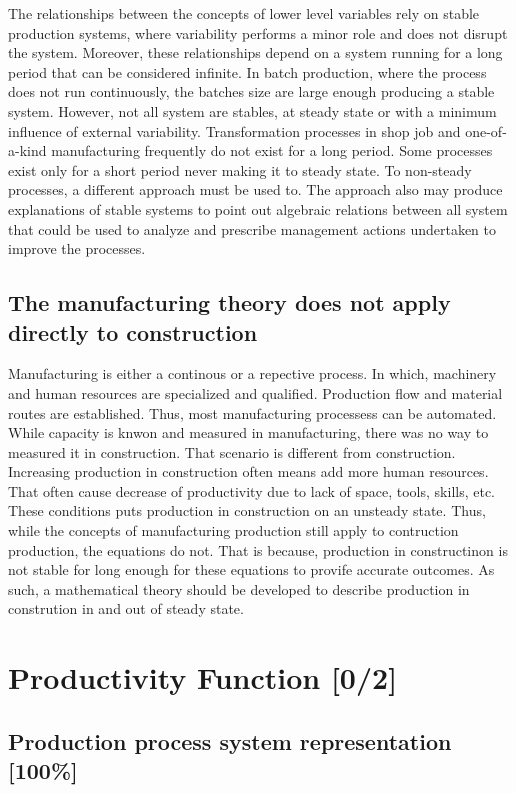 \documentclass{article}
\begin{document}
The relationships between the concepts of lower level variables rely on stable production systems, where variability performs a minor role and does not disrupt the system.
Moreover, these relationships depend on a system running for a long period that can be considered infinite.
In batch production, where the process does not run continuously, the batches size are large enough producing a stable system.
However, not all system are stables, at steady state or with a minimum influence of external variability.
Transformation processes in shop job and one-of-a-kind manufacturing frequently do not exist for a long period.
Some processes exist only for a short period never making it to steady state.
To non-steady processes, a different approach must be used to.
The approach also may produce explanations of stable systems to point out algebraic relations between all system that could be used to analyze and prescribe management actions undertaken to improve the processes.

\subsection{The manufacturing theory does not apply directly to construction}
\label{sec:org116b304}
Manufacturing is either a continous or a repective process.
In which, machinery and human resources are specialized and qualified.
Production flow and material routes are established. 
Thus, most manufacturing processess can be automated.
While capacity is knwon and measured in manufacturing, there was no way to measured it in construction.
That scenario is different from construction.
Increasing production in construction often means add more human resources.
That often cause decrease of productivity due to lack of space, tools, skills, etc.
These conditions puts production in construction on an unsteady state.
Thus, while the concepts of manufacturing production still apply to contruction production, the equations do not.
That is because, production in constructinon is not stable for long enough for these equations to provife accurate outcomes.
As such, a mathematical theory should be developed to describe production in constrution in and out of steady state.

\section{Productivity Function [0/2]}
\label{sec:org116064d}
\subsection{Production process system representation [100\%]}
\label{sec:org7e54ab3}
\end{document}
